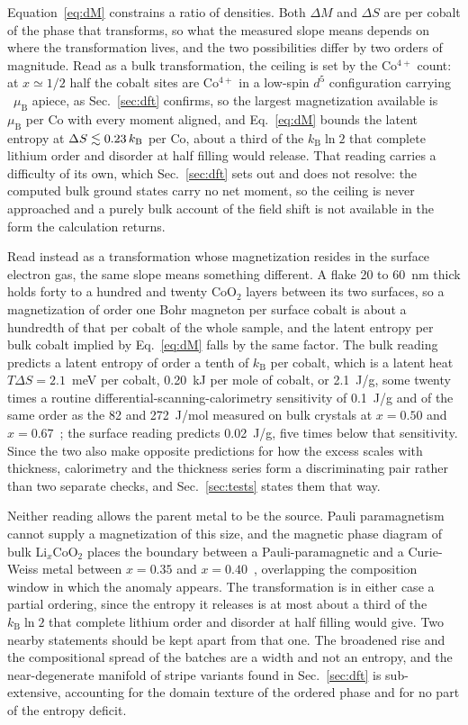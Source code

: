 \documentclass[reprint,twocolumn,prb,amsmath,amssymb,superscriptaddress,floatfix]{revtex4-2}
\newcommand{\kB}{k_{\mathrm{B}}}
\newcommand{\muBs}{\mu_{\mathrm{B}}}
\begin{document}
Equation~\eqref{eq:dM} constrains a ratio of densities. Both $\Delta M$ and $\Delta S$ are per
cobalt of the phase that transforms, so what the measured slope means depends on where the
transformation lives, and the two possibilities differ by two orders of magnitude. Read as a
bulk transformation, the ceiling is set by the Co$^{4+}$ count: at $x\simeq1/2$ half the cobalt
sites are Co$^{4+}$ in a low-spin $d^{5}$ configuration carrying \comomentRow~$\muBs$ apiece, as
Sec.~\ref{sec:dft} confirms, so the largest magnetization available is \msatRow~$\muBs$ per Co
with every moment aligned, and Eq.~\eqref{eq:dM} bounds the latent entropy at
$\Delta S\lesssim\dSbound\,\kB$ per Co, about a third of the $\kB\ln2$ that complete lithium
order and disorder at half filling would release. That reading carries a difficulty of its own,
which Sec.~\ref{sec:dft} sets out and does not resolve: the computed bulk ground states carry no
net moment, so the ceiling is never approached and a purely bulk account of the field shift is
not available in the form the calculation returns.

Read instead as a transformation whose magnetization resides in the surface electron gas, the
same slope means something different. A flake 20 to 60~nm thick holds forty to a hundred and
twenty CoO$_2$ layers between its two surfaces, so a magnetization of order one Bohr magneton
per surface cobalt is about a hundredth of that per cobalt of the whole sample, and the latent
entropy per bulk cobalt implied by Eq.~\eqref{eq:dM} falls by the same factor. The bulk reading
predicts a latent entropy of order a tenth of $\kB$ per cobalt, which is a latent heat
$T\Delta S=2.1$~meV per cobalt, 0.20~kJ per mole of cobalt, or 2.1~J/g, some twenty times a
routine differential-scanning-calorimetry sensitivity of 0.1~J/g and of the same order as the 82
and 272~J/mol measured on bulk crystals at $x=0.50$ and $x=0.67$~\cite{Motohashi2009}; the
surface reading predicts 0.02~J/g, five times below that sensitivity. Since the two also make
opposite predictions for how the excess scales with thickness, calorimetry and the thickness
series form a discriminating pair rather than two separate checks, and Sec.~\ref{sec:tests}
states them that way.

Neither reading allows the parent metal to be the source. Pauli paramagnetism cannot supply a
magnetization of this size, and the magnetic phase diagram of bulk Li$_x$CoO$_2$ places the
boundary between a Pauli-paramagnetic and a Curie-Weiss metal between $x=0.35$ and
$x=0.40$~\cite{Motohashi2009}, overlapping the composition window in which the anomaly appears.
The transformation is in either case a partial ordering, since the entropy it releases is at
most about a third of the $\kB\ln2$ that complete lithium order and disorder at half filling
would give. Two nearby statements should be kept apart from that one. The broadened rise and the
compositional spread of the batches are a width and not an entropy, and the near-degenerate
manifold of stripe variants found in Sec.~\ref{sec:dft} is sub-extensive, accounting for the
domain texture of the ordered phase and for no part of the entropy deficit.
\end{document}
